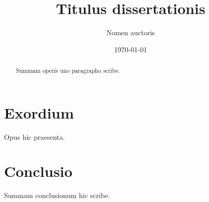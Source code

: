 \documentclass[12pt]{report}
\title{Titulus dissertationis}
\author{Nomen auctoris}
\date{\today}
\begin{document}
\maketitle

\begin{abstract}
Summam operis uno paragrapho scribe.
\end{abstract}

\tableofcontents

\chapter{Exordium}
Opus hic praesenta.

\chapter{Conclusio}
Summam conclusionum hic scribe.
\end{document}
